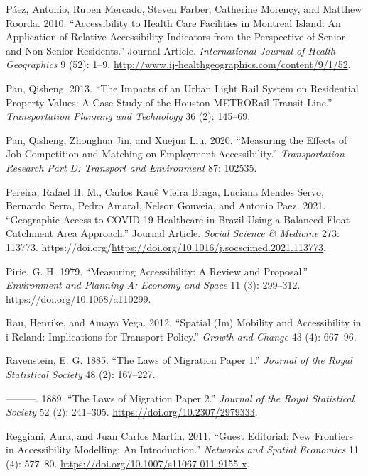 \documentclass[
]{article}
\newlength{\cslhangindent}
\newenvironment{CSLReferences}[2] %
 {\begin{list}{}{%
  \setlength{\itemindent}{0pt}
  \setlength{\leftmargin}{0pt}
  \setlength{\parsep}{0pt}
  \ifodd #1
   \setlength{\leftmargin}{\cslhangindent}
   \setlength{\itemindent}{-1\cslhangindent}
  \fi
  \setlength{\itemsep}{#2\baselineskip}}}
 {\end{list}}
\begin{document}
\begin{CSLReferences}{1}{0}
Páez, Antonio, Ruben Mercado, Steven Farber, Catherine Morency, and
Matthew Roorda. 2010. {``Accessibility to Health Care Facilities in
Montreal Island: An Application of Relative Accessibility Indicators
from the Perspective of Senior and Non-Senior Residents.''} Journal
Article. \emph{International Journal of Health Geographics} 9 (52):
1--9. \url{http://www.ij-healthgeographics.com/content/9/1/52}.

Pan, Qisheng. 2013. {``The Impacts of an Urban Light Rail System on
Residential Property Values: A Case Study of the Houston METRORail
Transit Line.''} \emph{Transportation Planning and Technology} 36 (2):
145--69.

Pan, Qisheng, Zhonghua Jin, and Xuejun Liu. 2020. {``Measuring the
Effects of Job Competition and Matching on Employment Accessibility.''}
\emph{Transportation Research Part D: Transport and Environment} 87:
102535.

Pereira, Rafael H. M., Carlos Kauê Vieira Braga, Luciana Mendes Servo,
Bernardo Serra, Pedro Amaral, Nelson Gouveia, and Antonio Paez. 2021.
{``Geographic Access to COVID-19 Healthcare in Brazil Using a Balanced
Float Catchment Area Approach.''} Journal Article. \emph{Social Science
\& Medicine} 273: 113773.
https://doi.org/\url{https://doi.org/10.1016/j.socscimed.2021.113773}.

Pirie, G. H. 1979. {``Measuring {Accessibility}: {A} {Review} and
{Proposal}.''} \emph{Environment and Planning A: Economy and Space} 11
(3): 299--312. \url{https://doi.org/10.1068/a110299}.

Rau, Henrike, and Amaya Vega. 2012. {``Spatial (Im) Mobility and
Accessibility in i Reland: Implications for Transport Policy.''}
\emph{Growth and Change} 43 (4): 667--96.

Ravenstein, E. G. 1885. {``The Laws of Migration Paper 1.''}
\emph{Journal of the Royal Statistical Society} 48 (2): 167--227.

---------. 1889. {``The Laws of Migration Paper 2.''} \emph{Journal of
the Royal Statistical Society} 52 (2): 241--305.
\url{https://doi.org/10.2307/2979333}.

Reggiani, Aura, and Juan Carlos Martín. 2011. {``Guest Editorial: New
Frontiers in Accessibility Modelling: An Introduction.''} \emph{Networks
and Spatial Economics} 11 (4): 577--80.
\url{https://doi.org/10.1007/s11067-011-9155-x}.


\end{CSLReferences}
\end{document}
